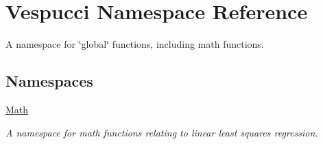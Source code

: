 \hypertarget{namespace_vespucci}{}\section{Vespucci Namespace Reference}
\label{namespace_vespucci}


A namespace for \char`\"{}global\char`\"{} functions, including math functions.  


\subsection*{Namespaces}
\begin{DoxyCompactItemize}
\item 
 \hyperlink{namespace_vespucci_1_1_math}{Math}
\begin{DoxyCompactList}\small\item\em A namespace for math functions relating to linear least squares regression. \end{DoxyCompactList}\end{DoxyCompactItemize}
